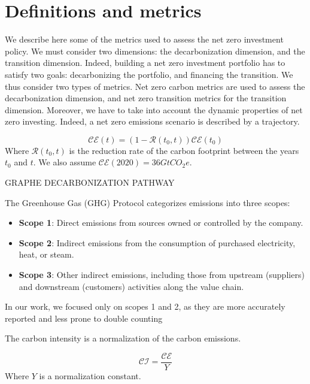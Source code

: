 \section{Definitions and metrics}
We describe here some of the metrics used to assess the net zero investment policy. We must consider two dimensions: the decarbonization dimension, and the transition dimension. Indeed, building a net zero investment portfolio has to satisfy two goals: decarbonizing the portfolio, and financing the transition. We thus consider two types of metrics. Net zero carbon metrics are used to assess the decarbonization dimension, and net zero transition metrics for the transition dimension. 
Moreover, we have to take into account the dynamic properties of net zero investing. Indeed, a net zero emissions scenario is described by a trajectory. 

\begin{definition}
    \begin{equation}
        \mathcal{CE}(t) = (1 - \mathcal{R}(t_0, t))\mathcal{CE}(t_0)
    \end{equation}
    Where $\mathcal{R}(t_0, t)$ is the reduction rate of the carbon footprint between the years $t_0$ and $t$. We also assume $\mathcal{CE}(2020)=36 GtCO_2e$.
\end{definition}
GRAPHE DECARBONIZATION PATHWAY

\begin{definition}
    The Greenhouse Gas (GHG) Protocol categorizes emissions into three scopes:  
        \begin{itemize}
            \item \textbf{Scope 1}: Direct emissions from sources owned or controlled by the company.
            \item \textbf{Scope 2}: Indirect emissions from the consumption of purchased electricity, heat, or steam.
            \item \textbf{Scope 3}: Other indirect emissions, including those from upstream (suppliers) and downstream (customers) activities along the value chain.
        \end{itemize}
    \end{definition}
    
In our work, we focused only on scopes 1 and 2, as they are more accurately reported and less prone to double counting

\begin{definition}
    The carbon intensity is a normalization of the carbon emissions.

    \begin{equation}
        \mathcal{CI} = \frac{\mathcal{CE}}{Y} 
    \end{equation}
    Where $Y$ is a normalization constant.
\end{definition}

